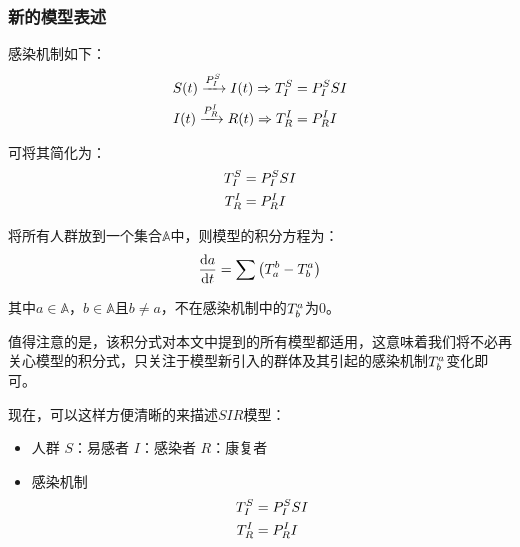 \subsubsection{新的模型表述}
\par 感染机制如下：
\begin{align}
S(t)\xrightarrow{P^{S}_{I}}I(t) \Rightarrow T^{S}_{I}&=P^{S}_{I}SI\\
I(t)\xrightarrow{P^{I}_{R}}R(t) \Rightarrow T^{I}_{R}&=P^{I}_{R}I
\end{align}
\par 可将其简化为：
\begin{align}
T^{S}_{I}&=P^{S}_{I}SI\\
T^{I}_{R}&=P^{I}_{R}I
\end{align}
\par 将所有人群放到一个集合$\mathbb{A}$中，则模型的积分方程为：
\begin{equation}
	\frac{\mathrm{d}a}{\mathrm{d}t} = \sum\left(T^{b}_{a}-T^{a}_{b}\right)
\end{equation}
\par 其中$a\in\mathbb{A}$，$b\in\mathbb{A}$且$b\not=a$，不在感染机制中的$T^{a}_{b}$为$0$。
\par 值得注意的是，该积分式对本文中提到的所有模型都适用，这意味着我们将不必再关心模型的积分式，只关注于模型新引入的群体及其引起的感染机制$T^{a}_{b}$变化即可。
\par 现在，可以这样方便清晰的来描述$SIR$模型：
\begin{itemize}
	\item 人群
	\subitem $S$：易感者
	\subitem $I$：感染者
	\subitem $R$：康复者
	\item 感染机制
	\subitem 
	\begin{align}
	T^{S}_{I}&=P^{S}_{I}SI\\
	T^{I}_{R}&=P^{I}_{R}I
	\end{align}
\end{itemize}
